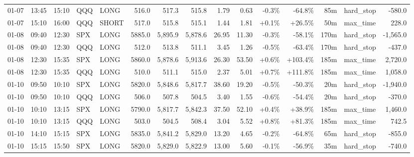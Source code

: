 \documentclass[11pt,a4paper,twoside]{article}
\begin{document}
\begin{landscape}
\begin{center}
\begin{longtable}{>{\color{txtmain}}l l l l l r r r r r r r r >{\color{txtmain}}l r}
01-07 & 13:45 & 15:10 & QQQ & LONG & 516.0 & 517.3 & 515.8 & 1.79 & 0.63 & \textcolor{lossred}{-0.3\%} & \textcolor{lossred}{-64.8\%} & 85m & hard\_stop & \textcolor{lossred}{-580.0} \\
01-07 & 15:10 & 16:00 & QQQ & SHORT & 517.0 & 515.8 & 515.1 & 1.44 & 1.81 & \textcolor{wingreen}{+0.1\%} & \textcolor{wingreen}{+26.5\%} & 50m & max\_time & \textcolor{wingreen}{228.0} \\
01-08 & 09:40 & 12:30 & SPX & LONG & 5885.0 & 5,895.9 & 5,878.6 & 26.95 & 11.30 & \textcolor{lossred}{-0.3\%} & \textcolor{lossred}{-58.1\%} & 170m & hard\_stop & \textcolor{lossred}{-1,565.0} \\
01-08 & 09:40 & 12:30 & QQQ & LONG & 512.0 & 513.8 & 511.1 & 3.45 & 1.26 & \textcolor{lossred}{-0.5\%} & \textcolor{lossred}{-63.4\%} & 170m & hard\_stop & \textcolor{lossred}{-437.0} \\
01-08 & 12:30 & 15:35 & SPX & LONG & 5860.0 & 5,878.6 & 5,913.6 & 26.30 & 53.50 & \textcolor{wingreen}{+0.6\%} & \textcolor{wingreen}{+103.4\%} & 185m & max\_time & \textcolor{wingreen}{2,720.0} \\
01-08 & 12:30 & 15:35 & QQQ & LONG & 510.0 & 511.1 & 515.0 & 2.37 & 5.01 & \textcolor{wingreen}{+0.7\%} & \textcolor{wingreen}{+111.8\%} & 185m & max\_time & \textcolor{wingreen}{1,058.0} \\
01-10 & 09:50 & 10:10 & SPX & LONG & 5820.0 & 5,848.6 & 5,817.7 & 38.60 & 19.20 & \textcolor{lossred}{-0.5\%} & \textcolor{lossred}{-50.3\%} & 20m & hard\_stop & \textcolor{lossred}{-1,940.0} \\
01-10 & 09:50 & 10:10 & QQQ & LONG & 506.0 & 507.8 & 504.5 & 3.40 & 1.55 & \textcolor{lossred}{-0.6\%} & \textcolor{lossred}{-54.4\%} & 20m & hard\_stop & \textcolor{lossred}{-370.0} \\
01-10 & 10:10 & 13:15 & SPX & LONG & 5790.0 & 5,817.7 & 5,842.3 & 37.50 & 52.10 & \textcolor{wingreen}{+0.4\%} & \textcolor{wingreen}{+38.9\%} & 185m & max\_time & \textcolor{wingreen}{1,460.0} \\
01-10 & 10:10 & 13:15 & QQQ & LONG & 503.0 & 504.5 & 508.4 & 3.04 & 5.52 & \textcolor{wingreen}{+0.8\%} & \textcolor{wingreen}{+81.3\%} & 185m & max\_time & \textcolor{wingreen}{742.5} \\
01-10 & 14:10 & 15:15 & SPX & LONG & 5835.0 & 5,841.2 & 5,829.0 & 13.20 & 4.65 & \textcolor{lossred}{-0.2\%} & \textcolor{lossred}{-64.8\%} & 65m & hard\_stop & \textcolor{lossred}{-855.0} \\
01-10 & 15:15 & 15:50 & SPX & LONG & 5820.0 & 5,829.0 & 5,822.9 & 13.00 & 5.60 & \textcolor{lossred}{-0.1\%} & \textcolor{lossred}{-56.9\%} & 35m & hard\_stop & \textcolor{lossred}{-740.0} \\

\end{longtable}
\end{center}
\end{landscape}
\end{document}
